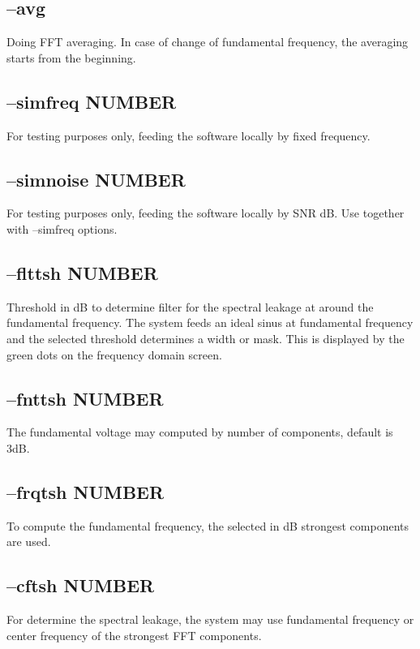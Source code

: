 \documentclass[10pt,a4paper]{article}
\begin{document}
\subsection{--avg}
Doing FFT averaging. In case of change of fundamental frequency, the averaging starts from the beginning.
\subsection{--simfreq NUMBER}
For testing purposes only, feeding the software locally by fixed frequency.
\subsection{--simnoise NUMBER}
For testing purposes only, feeding the software locally by SNR dB. Use together with --simfreq options.
\subsection{--flttsh NUMBER}
Threshold in dB to determine filter for the spectral leakage at around the fundamental frequency. The system feeds an ideal sinus at fundamental frequency and the selected threshold determines a width or mask. This is displayed by the green dots on the frequency domain screen.
\subsection{--fnttsh NUMBER}
The fundamental voltage may computed by number of components, default is 3dB.
\subsection{--frqtsh NUMBER}
To compute the fundamental frequency, the selected in dB strongest components are used.
\subsection{--cftsh NUMBER}
For determine the spectral leakage, the system may use fundamental frequency or center frequency of the strongest FFT components.
\end{document}
